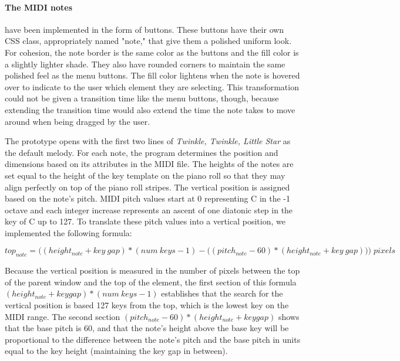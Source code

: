 \paragraph{The MIDI notes} have been implemented in the form of buttons. These buttons have their own CSS
class, appropriately named "note," that give them a polished uniform look. For cohesion, the note
border is the same color as the buttons and the fill color is a slightly lighter shade. They also
have rounded corners to maintain the same polished feel as the menu buttons. The fill color
lightens when the note is hovered over to indicate to the user which element they are selecting.
This transformation could not be given a transition time like the menu buttons, though, because
extending the transition time would also extend the time the note takes to move around when being
dragged by the user.

The prototype opens with the first two lines of \textit{Twinkle, Twinkle, Little Star} as the default
melody. For each note, the program determines the position and dimensions based on its attributes
in the MIDI file. The heights of the notes are set equal to the height of the key template on the
piano roll so that they may align perfectly on top of the piano roll stripes. The vertical position
is assigned based on the note's pitch. MIDI pitch values start at 0 representing C in the -1 octave
and each integer increase represents an ascent of one diatonic step in the key of C up to 127. To
translate these pitch values into a vertical position, we implemented the following formula:

\begin{equation} \label{note_vert}
  top_{note} = \Big((height_{note} + key\:gap) * (num\:keys - 1)  - \big((pitch_{note} -  60) * (height_{note} + key\:gap)\big)\Big)\;pixels
\end{equation}

Because the vertical position is measured in the number of pixels between the top of the parent
window and the top of the element, the first section of this formula $ (height_{note} + keygap) * (num\:keys - 1) $
establishes that the search for the vertical position is based 127 keys from the top, which is
the lowest key on the MIDI range. The second section $ (pitch_{note} -  60) * (height_{note} + keygap) $
shows that the base pitch is 60, and that the note's height above the base key will be
proportional to the difference between the note's pitch and the base pitch in units equal to the
key height (maintaining the key gap in between).

